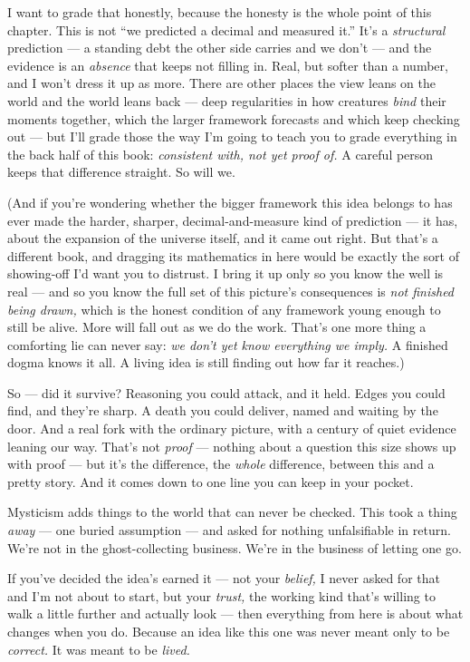 \documentclass[11pt,openany]{book}
\begin{document}
I want to grade that honestly, because the honesty is the whole point of this chapter. This is not “we predicted a decimal and measured it.” It’s a \textit{structural} prediction — a standing debt the other side carries and we don’t — and the evidence is an \textit{absence} that keeps not filling in. Real, but softer than a number, and I won’t dress it up as more. There are other places the view leans on the world and the world leans back — deep regularities in how creatures \textit{bind} their moments together, which the larger framework forecasts and which keep checking out — but I’ll grade those the way I’m going to teach you to grade everything in the back half of this book: \textit{consistent with, not yet proof of.} A careful person keeps that difference straight. So will we.

(And if you’re wondering whether the bigger framework this idea belongs to has ever made the harder, sharper, decimal-and-measure kind of prediction — it has, about the expansion of the universe itself, and it came out right. But that’s a different book, and dragging its mathematics in here would be exactly the sort of showing-off I’d want you to distrust. I bring it up only so you know the well is real — and so you know the full set of this picture’s consequences is \textit{not finished being drawn,} which is the honest condition of any framework young enough to still be alive. More will fall out as we do the work. That’s one more thing a comforting lie can never say: \textit{we don’t yet know everything we imply.} A finished dogma knows it all. A living idea is still finding out how far it reaches.)

So — did it survive? Reasoning you could attack, and it held. Edges you could find, and they’re sharp. A death you could deliver, named and waiting by the door. And a real fork with the ordinary picture, with a century of quiet evidence leaning our way. That’s not \textit{proof} — nothing about a question this size shows up with proof — but it’s the difference, the \textit{whole} difference, between this and a pretty story. And it comes down to one line you can keep in your pocket.

Mysticism adds things to the world that can never be checked. This took a thing \textit{away} — one buried assumption — and asked for nothing unfalsifiable in return. We’re not in the ghost-collecting business. We’re in the business of letting one go.

If you’ve decided the idea’s earned it — not your \textit{belief,} I never asked for that and I’m not about to start, but your \textit{trust,} the working kind that’s willing to walk a little further and actually look — then everything from here is about what changes when you do. Because an idea like this one was never meant only to be \textit{correct.} It was meant to be \textit{lived.}
\end{document}
